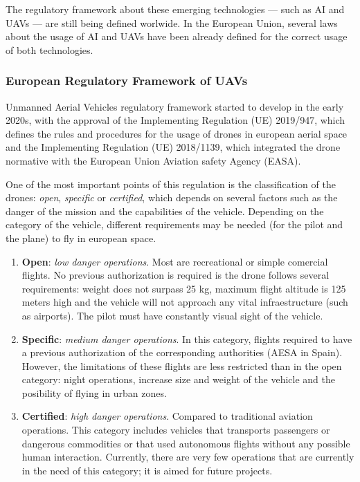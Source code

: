 \documentclass[12pt]{report} %
\begin{document}
The regulatory framework about these emerging technologies --- such as AI and UAVs --- are still being defined worlwide. In the European Union, several laws about the usage of AI and UAVs have been already defined for the correct usage of both technologies. 

\subsubsection{European Regulatory Framework of UAVs}

Unmanned Aerial Vehicles regulatory framework started to develop in the early 2020s, with the approval of the Implementing Regulation (UE) 2019/947, which defines the rules and procedures for the usage of drones in european aerial space and the Implementing Regulation (UE) 2018/1139, which integrated the drone normative with the European Union Aviation safety Agency (EASA).

One of the most important points of this regulation is the classification of the drones: \textit{open}, \textit{specific} or \textit{certified}, which depends on several factors such as the danger of the mission and the capabilities of the vehicle. Depending on the category of the vehicle, different requirements may be needed (for the pilot and the plane) to fly in european space.

\begin{enumerate}
	\item \textbf{Open}: \textit{low danger operations}. Most are recreational or simple comercial flights. No previous authorization is required is the drone follows several requirements: weight does not surpass 25 kg, maximum flight altitude is 125 meters high and the vehicle will not approach any vital infraestructure (such as airports). The pilot must have constantly visual sight of the vehicle.
	\item \textbf{Specific}: \textit{medium danger operations}. In this category, flights required to have a previous authorization of the corresponding authorities (AESA in Spain). However, the limitations of these flights are less restricted than in the open category: night operations, increase size and weight of the vehicle and the posibility of flying in urban zones.
	\item \textbf{Certified}: \textit{high danger operations}. Compared to traditional aviation operations. This category includes vehicles that transports passengers or dangerous commodities or that used autonomous flights without any possible human interaction. Currently, there are very few operations that are currently in the need of this category; it is aimed for future projects.
\end{enumerate}
\end{document}
